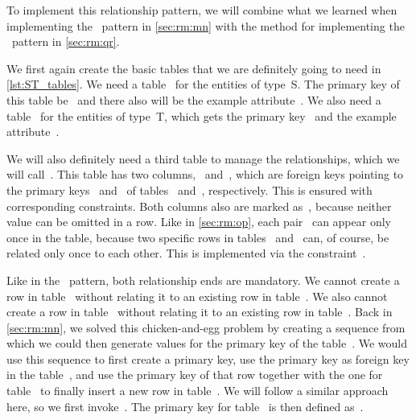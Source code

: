 To implement this relationship pattern, we will combine what we learned when implementing the ~pattern in \cref{sec:rm:mn} with the method for implementing the ~pattern in \cref{sec:rm:qr}.

We first again create the basic tables that we are definitely going to need in \cref{lst:ST_tables}.
We need a table~ for the entities of type~S.
The primary key of this table be~ and there also will be the example attribute~.
We also need a table~ for the entities of type~T, which gets the primary key~ and the example attribute~.%
%
\begin{sloppypar}%
We will also definitely need a third table to manage the relationships, which we will call~.
This table has two columns,~ and~, which are foreign keys pointing to the primary keys~ and~ of tables~ and~, respectively.
This is ensured with corresponding  constraints.
Both columns also are marked as~, because neither value can be omitted in a row.
Like in \cref{sec:rm:op}, each pair~ can appear only once in the table, because two specific rows in tables~ and~ can, of course, be related only once to each other.
This is implemented via the constraint~.%
\end{sloppypar}%
%
Like in the ~pattern, both relationship ends are mandatory.
We cannot create a row in table~ without relating it to an existing row in table~.
We also cannot create a row in table~ without relating it to an existing row in table~.
Back in \cref{sec:rm:mn}, we solved this chicken-and-egg problem by creating a sequence from which we could then generate values for the primary key of the table~.
We would use this sequence to first create a primary key, use the primary key as foreign key in the table~, and use the primary key of that row together with the one for table~ to finally insert a new row in table~.
We will follow a similar approach here, so we first invoke~.
The primary key for table~ is then defined as~.

